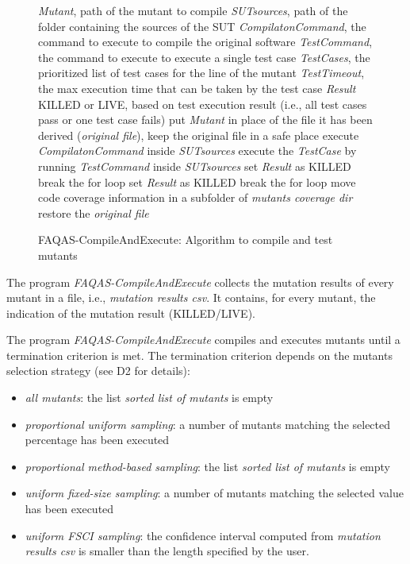 \begin{figure}[h]
\begin{algorithmic}[1]
\scriptsize
\Require \emph{Mutant}, path of the mutant to compile
\Require \emph{SUTsources}, path of the folder containing the sources of the SUT
\Require \emph{CompilatonCommand}, the command to execute to compile the original software
\Require \emph{TestCommand}, the command to execute to execute a single test case
\Require \emph{TestCases}, the prioritized list of test cases for the line of the mutant
\Require \emph{TestTimeout}, the max execution time that can be taken by the test case
\Ensure \emph{Result} KILLED or LIVE, based on test execution result (i.e., all test cases pass or one test case fails)
\State put \emph{Mutant} in place of the file it has been derived (\emph{original file}), keep the original file in a safe place
\State execute  \emph{CompilatonCommand} inside \emph{SUTsources}
\State execute the \emph{TestCase} by running \emph{TestCommand} inside \emph{SUTsources}
\State set \emph{Result} as KILLED
\State break the for loop
\EndIf
{}
\State set \emph{Result} as KILLED
\State break the for loop
\EndIf
\EndFor
\State move code coverage information in a subfolder of \emph{mutants coverage dir}
\State restore the \emph{original file}
\end{algorithmic}
\caption{FAQAS-CompileAndExecute: Algorithm to compile and test mutants}
\label{alg:compileAndExecute}
\end{figure}

The program \emph{FAQAS-CompileAndExecute} collects the mutation results of every mutant in a file, i.e., \emph{mutation results csv}. It contains, for every mutant, the indication of the mutation result (KILLED/LIVE).

The program \emph{FAQAS-CompileAndExecute} compiles and executes mutants until a termination criterion is met. The termination criterion depends on the mutants selection strategy (see D2 for details):
\begin{itemize}
\item \emph{all mutants}: the list \emph{sorted list of mutants} is empty
\item \emph{proportional uniform sampling}: a number of mutants matching the selected percentage has been executed
\item \emph{proportional method-based sampling}: the list \emph{sorted list of mutants} is empty
\item \emph{uniform fixed-size sampling}: a number of mutants matching the selected value has been executed
\item \emph{uniform FSCI sampling}: the confidence interval computed from \emph{mutation results csv} is smaller than the length specified by the user.
\end{itemize}

